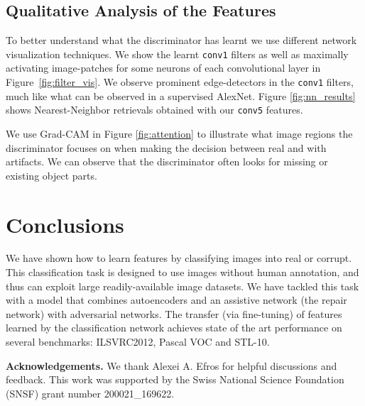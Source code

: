 \documentclass[10pt,twocolumn,letterpaper]{article}
\begin{document}
\subsection{Qualitative Analysis of the Features}
To better understand what the discriminator has learnt we use different network visualization techniques. We show the learnt \texttt{conv1} filters as well as maximally activating image-patches \cite{girshick14CVPR, yosinski-2015-ICML-DL-understanding-neural-networks} for some neurons of each convolutional layer in Figure~\ref{fig:filter_vis}. We observe prominent edge-detectors in the  \texttt{conv1} filters, much like what can be observed in a supervised AlexNet. Figure \ref{fig:nn_results} shows Nearest-Neighbor retrievals obtained with our \texttt{conv5} features. 

We use Grad-CAM \cite{selvaraju2016grad} in Figure \ref{fig:attention} to illustrate what image regions the discriminator focuses on when making the decision between real and with artifacts. We can observe that the discriminator often looks for missing or existing object parts.


\color{black}

\section{Conclusions}
We have shown how to learn features by classifying images into real or corrupt.
This classification task is designed to use images without human annotation, and thus can exploit large readily-available image datasets.
We have tackled this task with a model that combines autoencoders and an assistive network (the repair network) with adversarial networks. 
The transfer (via fine-tuning) of features learned by the classification network achieves state of the art performance on several benchmarks: ILSVRC2012, Pascal VOC and STL-10.%

\textbf{Acknowledgements.} We thank Alexei A. Efros for helpful discussions and feedback. This work was supported by the Swiss National Science Foundation (SNSF) grant number 200021\_169622.

{\small


}
\end{document}
